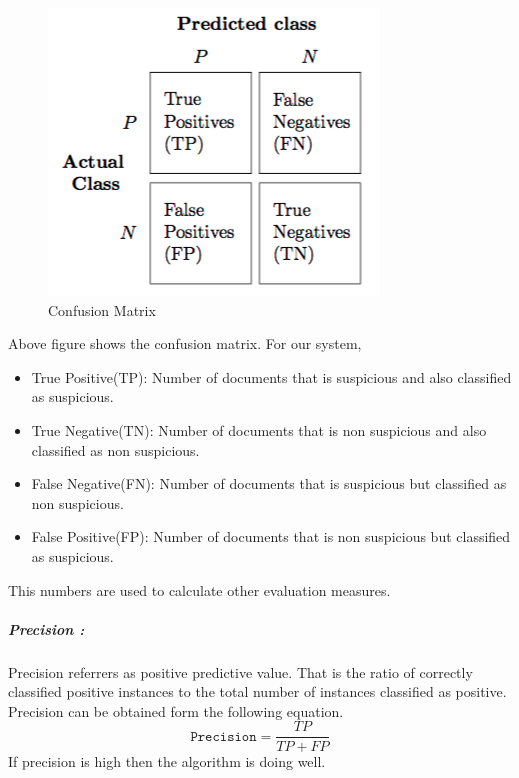 \begin{figure}[h!]
    \centering
    \includegraphics[scale=0.55]{Figures/confusion_matrix_1.png}
    \caption{Confusion Matrix}
    \label{fig:CM}
\end{figure}
\noindent
Above figure shows the confusion matrix. For our system,
\begin{itemize}
    \item True Positive(TP): Number of documents that is suspicious and also classified as suspicious.
    \item True Negative(TN): Number of documents that is non suspicious and also classified as non suspicious.
    \item False Negative(FN): Number of documents that is suspicious but classified as non suspicious.
    \item False Positive(FP): Number of documents that is non suspicious but classified as suspicious. 
\end{itemize}
\noindent
This numbers are used to calculate other evaluation measures.

\subparagraph{Precision :}
Precision referrers as positive predictive value. That is the ratio of
correctly classified positive instances to the total number of instances classified as positive. Precision can be obtained form  the following equation.
\begin{equation}
    \texttt{Precision} = \frac{TP}{TP+FP}
\end{equation}
If precision is high then the algorithm is doing well.

